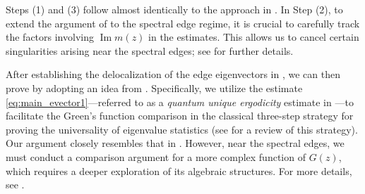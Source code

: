 \documentclass[10pt,reqno]{amsart}
\numberwithin{equation}{section}
\numberwithin{figure}{section}
\theoremstyle{plain} %
\theoremstyle{definition} %
\DeclareMathOperator{\im}{\mathrm{Im}}
\numberwithin{equation}{section}
\begin{document}
Steps (1) and (3) follow almost identically to the approach in \cite{stone2024randommatrixmodelquantum}. In Step (2), to extend the argument of \cite{stone2024randommatrixmodelquantum} to the spectral edge regime, it is crucial to carefully track the factors involving $\im m(z)$ in the estimates. This allows us to cancel certain singularities arising near the spectral edges; see  for further details.

After establishing the delocalization of the edge eigenvectors in , we can then prove  by adopting an idea from \cite{CFHJBulkBandAOP2024}. 
Specifically, we utilize the estimate \eqref{eq:main_evector1}---referred to as a \emph{quantum unique ergodicity} estimate in \cite{CFHJBulkBandAOP2024}---to facilitate the Green's function comparison in the classical three-step strategy for proving the universality of eigenvalue statistics (see \cite{Erds2017ADA} for a review of this strategy).
Our argument closely resembles that in \cite{stone2024randommatrixmodelquantum}. However, near the spectral edges, we must conduct a comparison argument for a more complex function of $G(z)$, which requires a deeper exploration of its algebraic structures. For more details, see .

 
\end{document}
